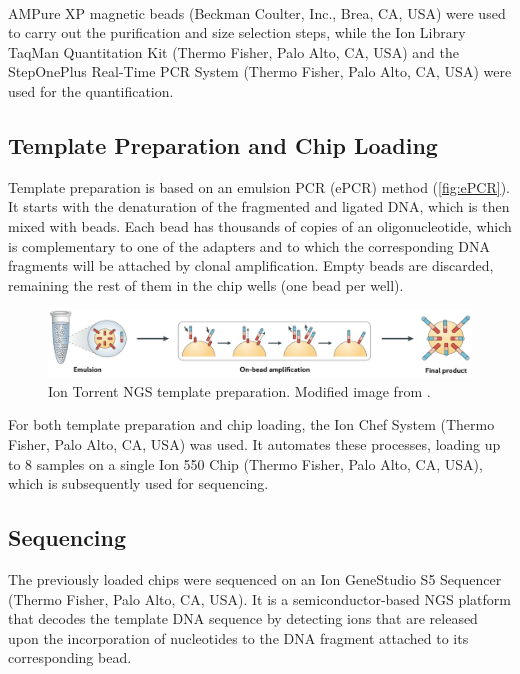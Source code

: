AMPure XP\textsuperscript\textregistered{} magnetic beads (Beckman Coulter, Inc., Brea, CA, USA) were used to carry out the purification and size selection steps, while the Ion Library TaqMan\texttrademark{} Quantitation Kit (Thermo Fisher, Palo Alto, CA, USA) and the StepOnePlus\texttrademark{} Real-Time PCR System (Thermo Fisher, Palo Alto, CA, USA) were used for the quantification.

\subsection{Template Preparation and Chip Loading}

Template preparation is based on an emulsion PCR (ePCR) method (\autoref{fig:ePCR}). It starts with the denaturation of the fragmented and ligated DNA, which is then mixed with beads. Each bead has thousands of copies of an oligonucleotide, which is complementary to one of the adapters and to which the corresponding DNA fragments will be attached by clonal amplification. Empty beads are discarded, remaining the rest of them in the chip wells (one bead per well).

\begin{figure}[ht]
    \centering
    \includegraphics[width=\textwidth]{Images/chapter_3/ePCR.png}
    \caption{Ion Torrent\texttrademark{} NGS template preparation. Modified image from \cite{NGS}.}
    \label{fig:ePCR}
\end{figure}

For both template preparation and chip loading, the Ion Chef\texttrademark{} System (Thermo Fisher, Palo Alto, CA, USA) was used. It automates these processes, loading up to 8 samples on a single Ion 550\texttrademark{} Chip (Thermo Fisher, Palo Alto, CA, USA), which is subsequently used for sequencing.

\subsection{Sequencing}

The previously loaded chips were sequenced on an Ion GeneStudio\texttrademark{} S5 Sequencer (Thermo Fisher, Palo Alto, CA, USA). It is a semiconductor-based NGS platform that decodes the template DNA sequence by detecting  ions that are released upon the incorporation of nucleotides to the DNA fragment attached to its corresponding bead. 


